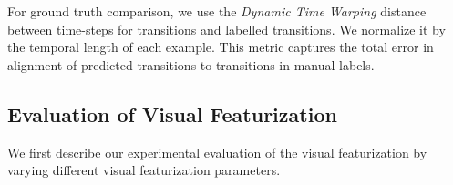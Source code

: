 For ground truth comparison, we use the \textit{Dynamic Time Warping} distance  between time-steps for transitions and labelled transitions. We normalize it by the temporal length of each example. This metric captures the total error in alignment of predicted transitions to transitions in manual labels. 


\begin{table}[bht!]
\centering
\caption{Evaluation of visual featurization schemes on Suturing}
\label{tab:visual}
\vspace{-15pt}
\end{table}

\subsection{Evaluation of Visual Featurization}
We first describe our experimental evaluation of the visual featurization by varying different visual featurization parameters.

